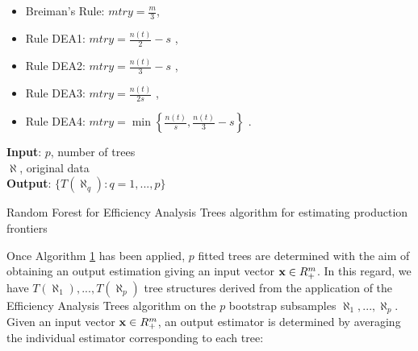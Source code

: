 \begin{itemize}
\item
  Breiman's Rule: \(mtry=\frac{m}{3}\),
\item
  Rule DEA1: \(mtry=\frac{n\left(t\right)}{2} -s\)
  \citep{golany1989, homburg2001},
\item
  Rule DEA2: \(mtry=\frac{n\left(t\right)}{3} -s\)
  \citep{nunamaker1985, banker1989, friedman1998, raab2002},
\item
  Rule DEA3: \(mtry=\frac{n\left(t\right)}{2s}\) \citep{dyson2001},
\item
  Rule DEA4:
  \(mtry=\min \left\{\frac{n\left(t\right)}{s}, \frac{n\left(t\right)}{3} -s\right\}\)
  \citep{cooper2007}.
\end{itemize}

\begin{algorithm}
\label{alg:algo1}
\SetAlgoLined
\textbf{Input}: $p$, number of trees \\
                $\aleph$, original data \\
\textbf{Output}: $\{T(\aleph_q): q = 1,..., p\}$ \\
 \caption{Random Forest for Efficiency Analysis Trees algorithm for estimating production frontiers}
\end{algorithm}

Once Algorithm \hyperref[alg:algo1]{1} has been applied, \(p\) fitted
trees are determined with the aim of obtaining an output estimation
giving an input vector \({\it \textbf{x}}\in R_{+}^{m}\). In this
regard, we have
\(T\left(\aleph _{1} \right),...,T\left(\aleph _{p} \right)\) tree
structures derived from the application of the Efficiency Analysis Trees
algorithm on the \(p\) bootstrap subsamples
\(\aleph _{1} ,...,\aleph _{p}\). Given an input vector
\({\it \textbf{x}}\in R_{+}^{m}\), an output estimator is determined by
averaging the individual estimator corresponding to each tree:

